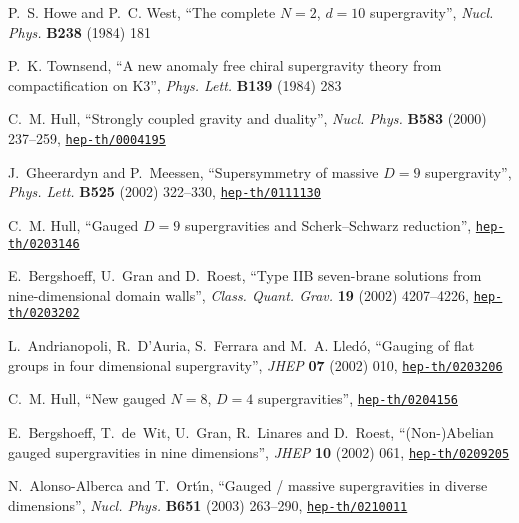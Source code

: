 \documentclass[a4paper,11pt,twoside]{article}
\begin{document}
\begin{thebibliography}{10}
{\sc P.~S. Howe and P.~C. West}, ``The complete $N=2$, $d = 10$
supergravity'',
   {\sl Nucl. Phys.} {\bf B238} (1984)
181

{\sc P.~K. Townsend}, ``A new anomaly free chiral supergravity theory
from
  compactification on K3'',  {\sl Phys. Lett.} {\bf B139} (1984)
283

{\sc C.~M. Hull}, ``Strongly coupled gravity and duality'',  {\sl Nucl.
Phys.}
  {\bf B583} (2000) 237--259,
\href{http://www.arXiv.org/abs/hep-th/0004195}{{\tt hep-th/0004195}}

{\sc J.~Gheerardyn and P.~Meessen}, ``Supersymmetry of massive $D = 9$
  supergravity'',  {\sl Phys. Lett.} {\bf B525} (2002) 322--330,
\href{http://www.arXiv.org/abs/hep-th/0111130}{{\tt hep-th/0111130}}

{\sc C.~M. Hull}, ``Gauged $D = 9$ supergravities and Scherk--Schwarz
  reduction'',
\href{http://www.arXiv.org/abs/hep-th/0203146}{{\tt hep-th/0203146}}

{\sc E.~Bergshoeff, U.~Gran  and D.~Roest}, ``Type IIB seven-brane
solutions
  from nine-dimensional domain walls'',  {\sl Class. Quant. Grav.} {\bf 19}
  (2002) 4207--4226,
\href{http://www.arXiv.org/abs/hep-th/0203202}{{\tt hep-th/0203202}}

{\sc L.~Andrianopoli, R.~D'Auria, S.~Ferrara  and M.~A. Lled{\'o}}, ``Gauging
  of flat groups in four dimensional supergravity'',  {\sl JHEP} {\bf 07}
  (2002) 010,
\href{http://www.arXiv.org/abs/hep-th/0203206}{{\tt hep-th/0203206}}

{\sc C.~M. Hull}, ``New gauged $N = 8$, $D = 4$ supergravities'',
\href{http://www.arXiv.org/abs/hep-th/0204156}{{\tt hep-th/0204156}}

{\sc E.~Bergshoeff, T.~de~Wit, U.~Gran, R.~Linares  and D.~Roest},
  ``(Non-)Abelian gauged supergravities in nine dimensions'',  {\sl JHEP} {\bf
  10} (2002) 061,
\href{http://www.arXiv.org/abs/hep-th/0209205}{{\tt hep-th/0209205}}

{\sc N.~Alonso-Alberca and T.~Ort{\'\i}n}, ``Gauged / massive supergravities
in
  diverse dimensions'',  {\sl Nucl. Phys.} {\bf B651} (2003) 263--290,
\href{http://www.arXiv.org/abs/hep-th/0210011}{{\tt hep-th/0210011}}


\end{thebibliography}
\end{document}
